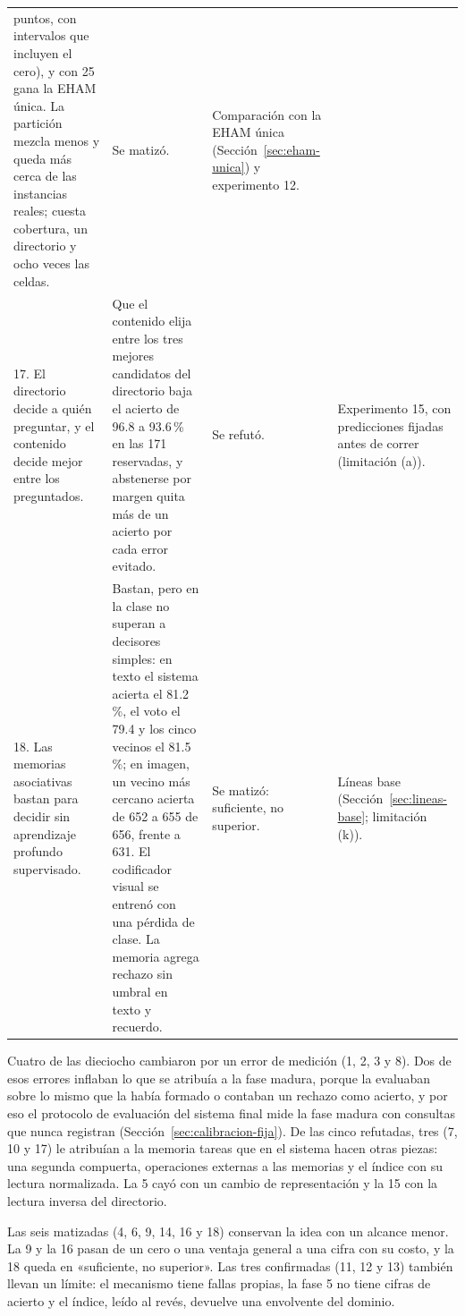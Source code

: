 \begin{table}[H]
\begin{tabular}{p{}p{}p{}p{}}
        puntos, con intervalos que incluyen el cero), y con 25 gana la EHAM única. La
        partición mezcla menos y queda más cerca de las instancias reales; cuesta
        cobertura, un directorio y ocho veces las celdas. &
        \raggedright Se matizó. &
        \raggedright Comparación con la EHAM única (Sección~\ref{sec:eham-unica}) y
        experimento 12. \tabularnewline\addlinespace[4pt]
        \raggedright 17. El directorio decide a quién preguntar, y el contenido decide
        mejor entre los preguntados. &
        \raggedright Que el contenido elija entre los tres mejores candidatos del
        directorio baja el acierto de 96.8 a 93.6\,\% en las 171 reservadas, y
        abstenerse por margen quita más de un acierto por cada error evitado. &
        \raggedright Se refutó. &
        \raggedright Experimento 15, con predicciones fijadas antes de correr
        (limitación (a)). \tabularnewline\addlinespace[4pt]
        \raggedright 18. Las memorias asociativas bastan para decidir sin aprendizaje
        profundo supervisado. &
        \raggedright Bastan, pero en la clase no superan a decisores simples: en texto el
        sistema acierta el 81.2\,\%, el voto el 79.4 y los cinco vecinos el 81.5\,\%; en
        imagen, un vecino más cercano acierta de 652 a 655 de 656, frente a 631. El
        codificador visual se entrenó con una pérdida de clase. La memoria agrega
        rechazo sin umbral en texto y recuerdo. &
        \raggedright Se matizó: suficiente, no superior. &
        \raggedright Líneas base (Sección~\ref{sec:lineas-base}; limitación (k)).
        \tabularnewline
        \bottomrule
    \end{tabular}
\end{table}

Cuatro de las dieciocho cambiaron por un error de medición (1, 2, 3 y 8).
Dos de esos errores inflaban lo que se atribuía a la fase madura, porque la evaluaban sobre lo mismo que la
había formado o contaban un rechazo como acierto, y por eso el protocolo de evaluación
del sistema final mide la fase madura con consultas que nunca registran
(Sección~\ref{sec:calibracion-fija}).
De las cinco refutadas, tres (7, 10 y 17) le atribuían a la memoria tareas que en el
sistema hacen otras piezas: una segunda compuerta, operaciones externas a las memorias y
el índice con su lectura normalizada.
La 5 cayó con un cambio de representación y la 15 con la lectura inversa del
directorio.

Las seis matizadas (4, 6, 9, 14, 16 y 18) conservan la idea con un alcance menor.
La 9 y la 16 pasan de un cero o una ventaja general a una cifra con su costo, y la 18
queda en «suficiente, no superior».
Las tres confirmadas (11, 12 y 13) también llevan un límite: el mecanismo tiene fallas
propias, la fase 5 no tiene cifras de acierto y el índice, leído al revés, devuelve una
envolvente del dominio.

